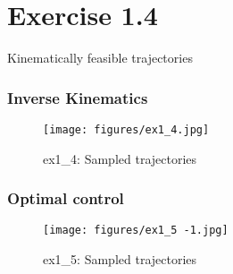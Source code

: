 \section*{Exercise 1.4}
Kinematically feasible trajectories

\subsubsection*{Inverse Kinematics}

\begin{figure*}[htbp]
    \centering
    \texttt{[image: figures/ex1\_4.jpg]}
    \caption{ex1\_4: Sampled trajectories}
\end{figure*}

\subsubsection*{Optimal control}

\begin{figure*}[htbp]
    \centering
    \texttt{[image: figures/ex1\_5 -1.jpg]}
    \caption{ex1\_5: Sampled trajectories}
\end{figure*}
